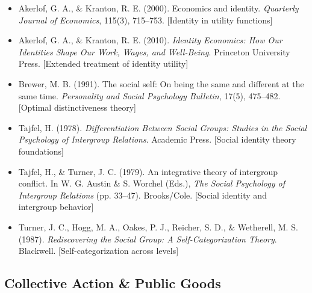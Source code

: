 \begin{itemize}

\item Akerlof, G. A., \& Kranton, R. E. (2000). 
Economics and identity. 
\textit{Quarterly Journal of Economics}, 115(3), 715--753.
[Identity in utility functions]

\item Akerlof, G. A., \& Kranton, R. E. (2010). 
\textit{Identity Economics: How Our Identities Shape Our Work, Wages, and Well-Being}. 
Princeton University Press.
[Extended treatment of identity utility]

\item Brewer, M. B. (1991). 
The social self: On being the same and different at the same time. 
\textit{Personality and Social Psychology Bulletin}, 17(5), 475--482.
[Optimal distinctiveness theory]

\item Tajfel, H. (1978). 
\textit{Differentiation Between Social Groups: Studies in the Social Psychology of Intergroup Relations}. 
Academic Press.
[Social identity theory foundations]

\item Tajfel, H., \& Turner, J. C. (1979). 
An integrative theory of intergroup conflict. 
In W. G. Austin \& S. Worchel (Eds.), \textit{The Social Psychology of Intergroup Relations} (pp. 33--47). 
Brooks/Cole.
[Social identity and intergroup behavior]

\item Turner, J. C., Hogg, M. A., Oakes, P. J., Reicher, S. D., \& Wetherell, M. S. (1987). 
\textit{Rediscovering the Social Group: A Self-Categorization Theory}. 
Blackwell.
[Self-categorization across levels]

\end{itemize}

\subsection*{Collective Action \& Public Goods}

